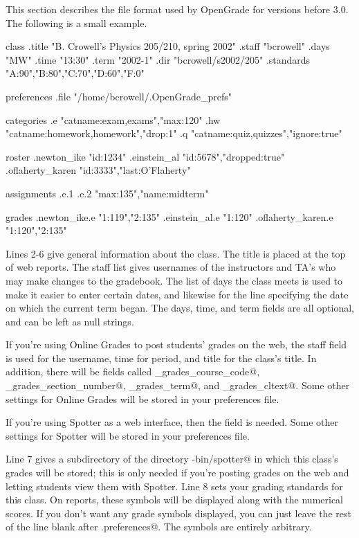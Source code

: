 \documentclass{opengrade_doc}
\begin{document}
\label{old-format}
This section describes the file format used by OpenGrade for versions before 3.0.
The following is a small example.

\begin{listing}{1}
class
  .title "B. Crowell's Physics 205/210, spring 2002"
  .staff "bcrowell"
  .days "MW"
  .time "13:30"
  .term "2002-1"
  .dir   "bcrowell/s2002/205"
  .standards "A:90","B:80","C:70","D:60","F:0" 

preferences
  .file "/home/bcrowell/.OpenGrade_prefs"

categories
  .e "catname:exam,exams","max:120"
  .hw "catname:homework,homework","drop:1"
  .q "catname:quiz,quizzes","ignore:true"

roster
  .newton_ike "id:1234"
  .einstein_al "id:5678","dropped:true"
  .oflaherty_karen "id:3333","last:O'Flaherty"

assignments
  .e.1
  .e.2 "max:135","name:midterm"

grades
  .newton_ike.e "1:119","2:135"
  .einstein_al.e "1:120"
  .oflaherty_karen.e "1:120","2:135"
\end{listing}

Lines 2-6 give general information about the class. The title is
placed at the top of web reports. The staff list gives usernames
of the instructors and TA's who may make changes to the gradebook.
The list of
days the class meets is
used to make it easier to enter certain dates, and likewise for
the line specifying the date on which the current
term began.  The days, time, and term fields are all optional, and
can be left as null strings.

If you're using Online Grades to post students' grades on the web,
the staff field is used
for the username, time for period, and title for the class's title.
In addition, there will be fields called \verb@online_grades_course_code@,
\verb@online_grades_section_number@, \verb@online_grades_term@, and \verb@online_grades_cltext@.
Some other settings for Online Grades will be stored in your preferences file.

If you're using Spotter as a web interface, then the \verb@dir@ field
is needed.
Some other settings for Spotter will be stored in your preferences file.

Line 7 gives a subdirectory of the directory \verb@cgi-bin/spotter@
in which this class's
grades will be stored; this is only needed if you're posting grades
on the web and letting students view them with Spotter.
Line 8 sets your grading standards for this class. On reports, these
symbols will be displayed along with the numerical scores. If you
don't want any grade symbols displayed, you can just leave the rest of
the line blank after \verb@.preferences@. The symbols are entirely
arbitrary.
\end{document}
